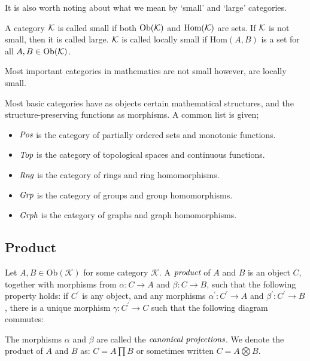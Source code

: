 It is also worth noting about what we mean by `small' and `large' categories.

\begin{defn}
	A category $\mathcal{K}$ is called small if both $\text{Ob}(\mathcal{K})$ and $\text{Hom}(\mathcal{K})$ are sets.
	If $\mathcal{K}$ is not small, then it is called large.
	$\mathcal{K}$ is called locally small if $\text{Hom}(A,B)$ is a set for all $A, B \in \text{Ob}(\mathcal{K})$.
\end{defn}

\begin{rem}
	Most important categories in mathematics are not small however, are locally small.
\end{rem}

Most basic categories have as objects certain mathematical structures, and the structure-preserving
functions as morphisms. A common list is given;
\begin{itemize}
\item $\emph{Pos}$ is the category of partially ordered sets and monotonic functions.
\item $\emph{Top}$ is the category of topological spaces and continuous functions.
\item $\emph{Rng}$ is the category of rings and ring homomorphisms.
\item $\emph{Grp}$ is the category of groups and group homomorphisms.
\item $\emph{Grph}$ is the category of graphs and graph homomorphisms.
\end{itemize}

\subsection{Product} %
\label{subsec:product}
Let $A,B \in \text{Ob}(\mathcal{K})$ for some category $\mathcal{K}$.
A $\emph{product}$ of $A$ and $B$ is an object $C$, together with morphisms from
$\alpha: C \to A$ and $\beta: C \to B$, such that the following property holds:
if $C^{'}$ is any object, and any morphisms $\alpha^{'}: C^{'} \to A$ and $\beta^{'}: C^{'} \to B$,
there is a unique morphism $\gamma: C^{'} \to C$ such that the following diagram commutes:


The morphisms $\alpha$ and $\beta$ are called the $\emph{canonical projections}$.
We denote the product of $A$ and $B$ as: $C = A \prod B$ or sometimes written $C = A \bigotimes B$.
